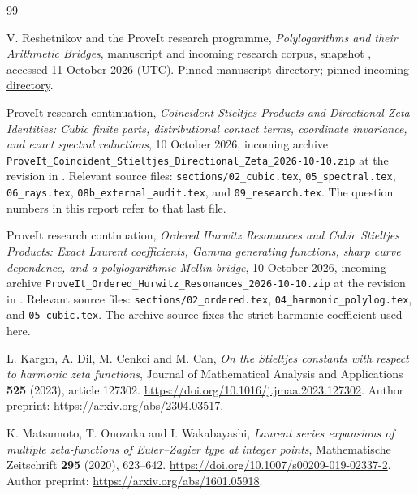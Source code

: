 \begin{thebibliography}{99}
\raggedright
{}

V. Reshetnikov and the ProveIt research programme,
\emph{Polylogarithms and their Arithmetic Bridges}, manuscript and
incoming research corpus, snapshot \sourcecommit, accessed
11 October 2026 (UTC).
\href{https://github.com/VladimirReshetnikov/ProveIt/tree/5a790187c8e186e41e2b990b4941cb7a1a3c7b6b/Analysis/Polylogarithms/docs/manuscript}{Pinned manuscript directory};
\href{https://github.com/VladimirReshetnikov/ProveIt/tree/5a790187c8e186e41e2b990b4941cb7a1a3c7b6b/docs/incoming}{pinned incoming directory}.

ProveIt research continuation,
\emph{Coincident Stieltjes Products and Directional Zeta Identities:
Cubic finite parts, distributional contact terms, coordinate
invariance, and exact spectral reductions},
10 October 2026, incoming archive
\texttt{ProveIt\_Coincident\_Stieltjes\_Directional\_Zeta\_2026-10-10.zip}
at the revision in \cite{Repo}.
Relevant source files: \texttt{sections/02\_cubic.tex},
\texttt{05\_spectral.tex}, \texttt{06\_rays.tex},
\texttt{08b\_external\_audit.tex}, and \texttt{09\_research.tex}.
The question numbers in this report refer to that last file.

ProveIt research continuation,
\emph{Ordered Hurwitz Resonances and Cubic Stieltjes Products:
Exact Laurent coefficients, Gamma generating functions, sharp curve
dependence, and a polylogarithmic Mellin bridge},
10 October 2026, incoming archive
\texttt{ProveIt\_Ordered\_Hurwitz\_Resonances\_2026-10-10.zip}
at the revision in \cite{Repo}.
Relevant source files: \texttt{sections/02\_ordered.tex},
\texttt{04\_harmonic\_polylog.tex}, and \texttt{05\_cubic.tex}.
The archive source fixes the strict harmonic coefficient used here.

L. Karg\i n, A. Dil, M. Cenkci and M. Can,
\emph{On the Stieltjes constants with respect to harmonic zeta
functions}, Journal of Mathematical Analysis and Applications
\textbf{525} (2023), article 127302.
\url{https://doi.org/10.1016/j.jmaa.2023.127302}.
Author preprint: \url{https://arxiv.org/abs/2304.03517}.

K. Matsumoto, T. Onozuka and I. Wakabayashi,
\emph{Laurent series expansions of multiple zeta-functions of
Euler--Zagier type at integer points}, Mathematische Zeitschrift
\textbf{295} (2020), 623--642.
\url{https://doi.org/10.1007/s00209-019-02337-2}.
Author preprint: \url{https://arxiv.org/abs/1601.05918}.


\end{thebibliography}
